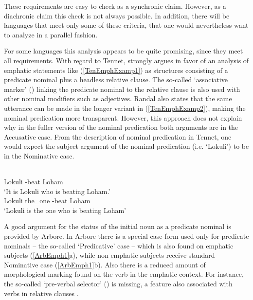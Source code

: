 These requirements are easy to check as a synchronic claim. 
However, as a diachronic claim this check is not always possible.
In addition, there will be languages that meet only some of these criteria, that one would nevertheless want to analyze in a parallel fashion.

For some languages this analysis appears to be quite promising, since they meet all requirements. 
With regard to Tennet, \citet[261]{Randal:1998} strongly argues in favor of an analysis of emphatic statements like (\ref{TenEmphExamp1}) as structures consisting of a predicate nominal plus a headless relative clause. 
The so-called `associative marker' (\am{}) linking the predicate nominal to the relative clause is also used with other nominal modifiers such as adjectives. 
Randal also states that the same utterance can be made in the longer variant in (\ref{TenEmphExamp2}), making the nominal predication more transparent. 
However, this approach does not explain why in the fuller version of the nominal predication both arguments are in the Accusative case. 
From the description of nominal predication in Tennet, one would expect the subject argument of the nominal predication (i.e. `Lokuli') to be in the Nominative case.

\begin{exe}\ex{}
\begin{xlist}
\ex\label{TenEmphExamp1}\gll{}   \\
Lokuli \am{} \ipfv{}-beat Loham\\
\glt `It is Lokuli who is beating Loham.' 
\ex\label{TenEmphExamp2}\gll{}    \\
Lokuli the\_one \am{} \ipfv{}-beat Loham\\
\glt `Lokuli is the one who is beating Loham' 
\end{xlist}
\end{exe}

A good argument for the status of the initial noun as a predicate nominal is provided by Arbore.
In Arbore there is a special case-form used only for predicate nominals -- the so-called `Predicative' case -- which is also found on emphatic subjects (\ref{ArbEmph1}a), while non-emphatic subjects receive standard Nominative case (\ref{ArbEmph1}b). 
Also there is a reduced amount of morphological marking found on the verb in the emphatic context. 
For instance, the so-called `pre-verbal selector' (\pvs{}) is missing, a feature also associated with verbs in relative clauses \citep[315]{Hayward:1984}. 

